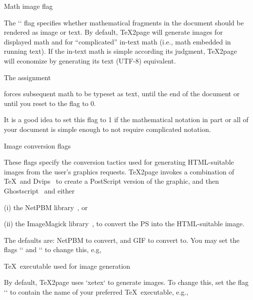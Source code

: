 \beginsection Math image flag

The `\TZPmathtext` flag
specifies whether mathematical fragments in the
document should be rendered as image or text.  By default, \TeX2page will
generate images for displayed math and for “complicated”
in-text math (i.e., math embedded in running text).   If the
in-text math is simple according its judgment, \TeX2page will
economize by generating its text (UTF-8) equivalent.

The assignment

\begintt
\let\TZPmathtext=1
\endtt
%
forces subsequent math to be typeset as text, until the end of the document or
until you reset to the flag to 0.

It is a good idea to set this flag to 1 if the
mathematical notation in part or all of your document is simple enough to
not require complicated notation.

\beginsection Image conversion flags

%
These flags specify the conversion tactics used
for generating HTML-suitable images from the user’s graphics
requests.  \TeX2page invokes a combination of \TeX\ and
Dvips~\cite{dvips} to create a PostScript version of the
graphic, and then Ghostscript~\cite{gs} and either \item(i) the
NetPBM library~\cite{netpbm}, or \item(ii) the ImageMagick
library~\cite{imagemagick}, to convert the PS into the
HTML-suitable image.

The defaults are: NetPBM
to convert, and GIF to convert to.
You may set the flags `\TZPimageconverter` and `\TZPimageformat` to
change this, e.g,

\begintt
\def\TZPimageconverter{imagemagick}  %
\def\TZPimageconverter{netpbm}       %

\def\TZPimageformat{png}  %
\def\TZPimageformat{jpeg} %
\def\TZPimageformat{gif}  %
\endtt

\beginsection \TeX\ executable used for image generation

By default, \TeX2page uses `xetex` to
generate images. To change this, set the flag `\TZPtexprogname` to
contain the name of your preferred \TeX\ executable, e.g.,

